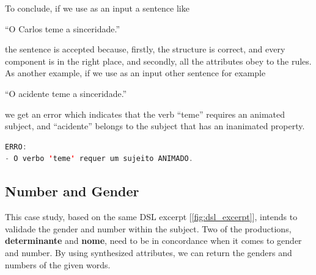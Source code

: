 
To conclude, if we use as an input a sentence like

``O Carlos teme a sinceridade.''

\noindent the sentence is accepted because, firstly, the structure is correct, and every component is in the right place, and secondly, all the attributes obey to the rules. As another example, if we use as an input other sentence for example

``O acidente teme a sinceridade.''

\noindent we get an error which indicates that the verb ``teme'' requires an animated subject, and ``acidente'' belongs to the subject that has an inanimated property.

\begin{center}
\begin{minipage}{10cm}
\begin{lstlisting}[language=java, basicstyle=\small, label={lst:error_message_dsl}, caption=Example of an error message]
ERRO:
- O verbo 'teme' requer um sujeito ANIMADO.
\end{lstlisting}
\end{minipage}
\end{center}



\subsection{Number and Gender}
This case study, based on the same \textsc{DSL} excerpt [\ref{fig:dsl_excerpt}], intends to validade the gender and number within the subject. Two of the productions, \textbf{determinante} and \textbf{nome}, need to be in concordance when it comes to gender and number. By using synthesized attributes, we can return the genders and numbers of the given words.

